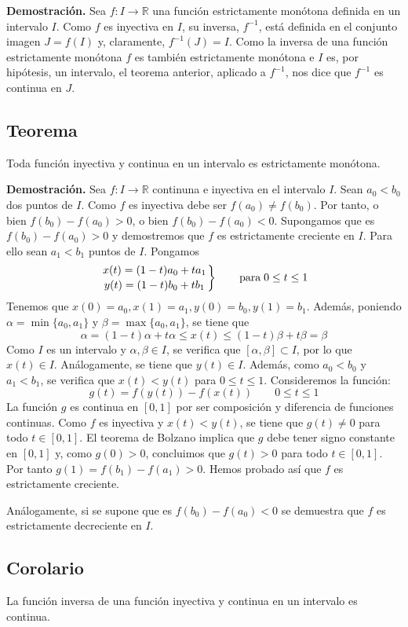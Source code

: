 \documentclass[10pt,a4paper]{article}
\begin{document}
	
	\textbf{Demostración. }Sea $f : I \rightarrow \mathbb{R}$ una función estrictamente monótona definida en un intervalo $I$. Como $f$ es inyectiva en $I$, su inversa, $f^{-1}$, está definida en el conjunto imagen $J = f(I)$ y, claramente, $f^{-1}(J) = I$. Como la inversa de una función estrictamente monótona $f$ es también estrictamente monótona e $I$ es, por hipótesis, un intervalo, el teorema anterior, aplicado a $f^{-1}$, nos dice que $f^{-1}$ es continua en $J$.
	
	\subsection{Teorema}
	Toda función inyectiva y continua en un intervalo es estrictamente monótona.
	
	\textbf{Demostración. }Sea $f: I \rightarrow \mathbb{R}$ continuna e inyectiva en el intervalo $I$. Sean $a_0 < b_0$ dos puntos de $I$. Como $f$ es inyectiva debe ser $f(a_0) \neq f(b_0)$. Por tanto, o bien $f(b_0) - f(a_0) > 0$, o bien $f(b_0) - f(a_0) < 0$. Supongamos que es $f(b_0) - f(a_0) > 0$ y demostremos que $f$ es estrictamente creciente en $I$. Para ello sean $a_1 < b_1$ puntos de $I$. Pongamos
	$$ \left. x(t) = (1-t)a_0 + ta_1 \atop y(t) = (1-t)b_0 + tb_1 \right\} \qquad  \text{para} \; 0 \leq t \leq 1$$
	Tenemos que $x(0) = a_0, x(1) = a_1, y(0) = b_0, y(1) = b_1$. Además, poniendo $\alpha = \min\{a_0, a_1\}$ y $\beta = \max\{a_0, a_1\}$, se tiene que 
	$$\alpha = (1-t)\alpha + t\alpha \leq x(t) \leq (1-t)\beta + t\beta = \beta$$
	Como $I$ es un intervalo y $\alpha, \beta \in I$, se verifica que $[\alpha, \beta] \subset I$, por lo que $x(t) \in I$. Análogamente, se tiene que $y(t) \in I$. Además, como $a_0 < b_0$ y $a_1 < b_1$, se verifica que $x(t) < y(t)$ para $0 \leq t \leq 1$. Consideremos la función:
	$$g(t) = f(y(t)) - f(x(t)) \qquad 0 \leq t \leq 1$$
	La función $g$ es continua en $[0, 1]$ por ser composición y diferencia de funciones continuas. Como $f$ es inyectiva y $x(t) < y(t)$, se tiene que $g(t) \neq 0$ para todo $t \in [0, 1]$. El teorema de Bolzano implica que $g$ debe tener signo constante en $[0, 1]$ y, como $g(0) > 0$, concluimos que $g(t) > 0$ para todo $t \in [0, 1]$. Por tanto $g(1) = f(b_1) - f(a_1) > 0$. Hemos probado así que $f$ es estrictamente creciente.
	
	Análogamente, si se supone que es $f(b_0) - f(a_0) < 0$ se demuestra que $f$ es estrictamente decreciente en $I$.
	
	\subsection{Corolario}
	La función inversa de una función inyectiva y continua en un intervalo es continua.
	
\end{document}
